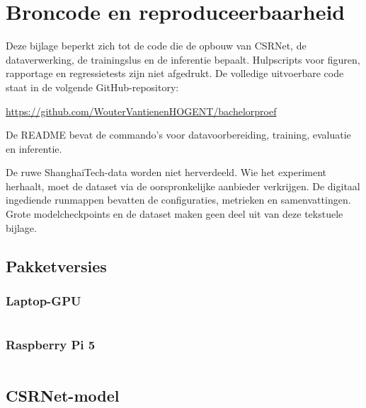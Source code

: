 
\chapter{Broncode en reproduceerbaarheid}
\label{app:broncode}

Deze bijlage beperkt zich tot de code die de opbouw van CSRNet, de dataverwerking, de trainingslus en de inferentie bepaalt. Hulpscripts voor figuren, rapportage en regressietests zijn niet afgedrukt. De volledige uitvoerbare code staat in de volgende GitHub-repository:
\begin{center}
    \url{https://github.com/WouterVantienenHOGENT/bachelorproef}
\end{center}
De README bevat de commando's voor datavoorbereiding, training, evaluatie en inferentie.

De ruwe ShanghaiTech-data worden niet herverdeeld. Wie het experiment herhaalt, moet de dataset via de oorspronkelijke aanbieder verkrijgen. De digitaal ingediende runmappen bevatten de configuraties, metrieken en samenvattingen. Grote modelcheckpoints en de dataset maken geen deel uit van deze tekstuele bijlage.

\section{Pakketversies}

\subsection{Laptop-GPU}
\inputminted[fontsize=\scriptsize]{text}{../crowd_counting/requirements-final.txt}

\subsection{Raspberry Pi 5}
\inputminted[fontsize=\scriptsize]{text}{../crowd_counting/requirements-rpi.txt}

\clearpage
\section{CSRNet-model}
\inputminted[fontsize=\scriptsize]{python}{../crowd_counting/csrnet.py}

\clearpage
